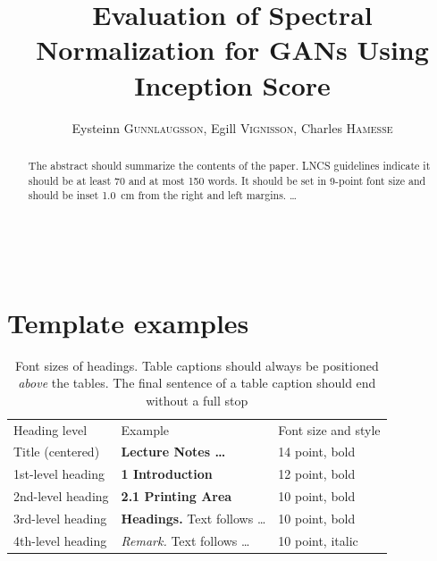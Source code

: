 \documentclass[runningheads]{llncs}
\begin{document}
\pagestyle{headings}
\mainmatter

%
\def\ECCV16SubNumber{16}
\def\GroupNumber{16}
\title{Evaluation of Spectral Normalization for GANs Using Inception Score}
\author{Eysteinn \textsc{Gunnlaugsson},
	Egill \textsc{Vignisson},
	Charles \textsc{Hamesse}}
\institute{Group \GroupNumber}
\maketitle

%
\begin{abstract}
The abstract should summarize the contents of the paper. LNCS guidelines
indicate it should be at least 70 and at most 150 words. It should be set in 9-point
font size and should be inset 1.0~cm from the right and left margins. \dots
{}
\end{abstract}

%






%



%
~\\
\pagebreak
\appendix
\section{Template examples}

\setlength{\tabcolsep}{4pt}
\begin{table}
\begin{center}
\caption{Font sizes of headings. Table captions should always be
positioned {\it above} the tables. The final sentence of a table
caption should end without a full stop}
\label{table:headings}
\begin{tabular}{lll}
\hline\noalign{\smallskip}
Heading level & Example & Font size and style\\
\noalign{\smallskip}
\hline
\noalign{\smallskip}
Title (centered)  & {\Large \bf Lecture Notes \dots} & 14 point, bold\\
1st-level heading & {\large \bf 1 Introduction} & 12 point, bold\\
2nd-level heading & {\bf 2.1 Printing Area} & 10 point, bold\\
3rd-level heading & {\bf Headings.} Text follows \dots & 10 point, bold
\\
4th-level heading & {\it Remark.} Text follows \dots & 10 point,
italic\\
\hline
\end{tabular}
\end{center}
\end{table}
\setlength{\tabcolsep}{1.4pt}
\end{document}
